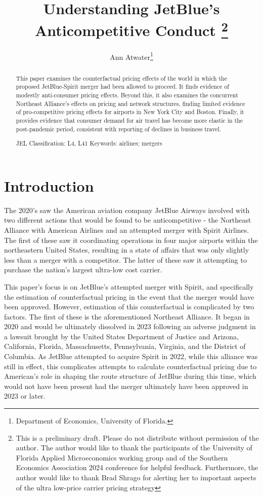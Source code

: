 \documentclass{article}
\author{Ann Atwater\footnote{Department of Economics, University of Florida.}}
\title{Understanding JetBlue's Anticompetitive Conduct \footnote{This is a preliminary draft. Please do not distribute without permission of the author. The author would like to thank the participants of the University of Florida Applied Microeconomics working group and of the Southern Economics Association 2024 conference for helpful feedback. Furthermore, the author would like to thank Brad Shrago for alerting her to important aspects of the ultra low-price carrier pricing strategy}}
\begin{document}
	\maketitle
	
	\begin{abstract}
	This paper examines the counterfactual pricing effects of the world in which the proposed JetBlue-Spirit merger had been allowed to proceed. It finds evidence of modestly anti-consumer pricing effects. Beyond this, it also examines the concurrent Northeast Alliance's effects on pricing and network structures, finding limited evidence of pro-competitive pricing effects for airports in New York City and Boston. Finally, it provides evidence that consumer demand for air travel has become more elastic in the post-pandemic period, consistent with reporting of declines in business travel.


		\bigskip
		
	\noindent JEL Classification: L4, L41 \newline
	\noindent Keywords: airlines; mergers
		
	\end{abstract}
	
	\pagebreak
	
	\doublespacing
	
	\section{Introduction}
	\label{sec:Introduction}
	The 2020's saw the American aviation company JetBlue Airways involved with two different actions that would be found to be anticompetitive - the Northeast Alliance with American Airlines and an attempted merger with Spirit Airlines. The first of these saw it coordinating operations in four major airports within the northeastern United States, resulting in a state of affairs that was only slightly less than a merger with a competitor. The latter of these saw it attempting to purchase the nation's largest ultra-low cost carrier. 
	
	This paper's focus is on JetBlue's attempted merger with Spirit, and specifically the estimation of counterfactual pricing in the event that the merger would have been approved. However, estimation of this counterfactual is complicated by two factors. The first of these is the aforementioned Northeast Alliance. It began in 2020 and would be ultimately dissolved in 2023 following an adverse judgment in a lawsuit brought by the United States Department of Justice and Arizona, California, Florida, Massachusetts, Pennsylvania, Virginia, and the District of Columbia. As JetBlue attempted to acquire Spirit in 2022, while this alliance was still in effect, this complicates attempts to calculate counterfactual pricing due to American's role in shaping the route structure of JetBlue during this time, which would not have been present had the merger ultimately have been approved in 2023 or later. 
	
\end{document}
